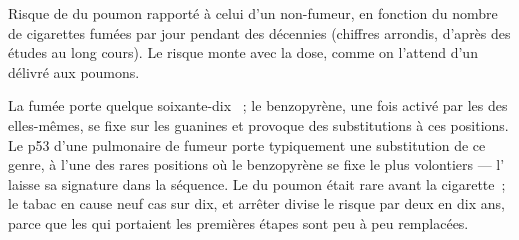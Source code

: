 \begin{omfigure}

{\small Risque de  du poumon rapporté à celui d'un non-fumeur, en
fonction du nombre de cigarettes fumées par jour pendant des décennies
(chiffres arrondis, d'après des études au long cours). Le risque monte
avec la dose, comme on l'attend d'un  délivré aux
poumons.}
\end{omfigure}

\begin{example}[Le tabac]\label{ex:g11:cancer:tobacco}
La fumée porte quelque soixante-dix ~; le
benzopyrène, une fois activé par les  des  elles-mêmes,
se fixe sur les guanines et provoque des substitutions à ces positions.
Le  p53 d'une  pulmonaire de fumeur porte typiquement une
substitution de ce genre, à l'une des rares positions où le benzopyrène
se fixe le plus volontiers --- l' laisse sa signature
dans la séquence. Le  du poumon était rare avant la cigarette~;
le tabac en cause neuf cas sur dix, et arrêter divise le risque par
deux en dix ans, parce que les  qui portaient les premières
étapes sont peu à peu remplacées.
\end{example}

